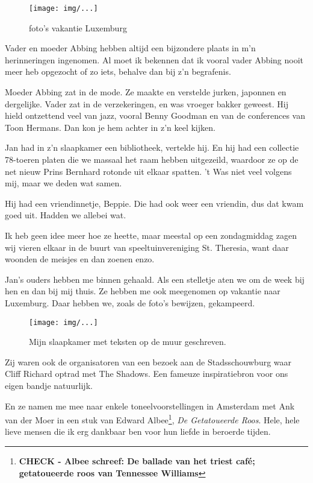 \documentclass[10pt,twoside,openright]{memoir}
\begin{document}
\begin{figure}[t]
\texttt{[image: img/...]}
\caption{foto’s vakantie Luxemburg}
\end{figure}

Vader en moeder Abbing hebben altijd een bijzondere plaats in m’n herinneringen ingenomen. Al moet ik bekennen dat ik vooral vader Abbing nooit meer heb opgezocht of zo iets, behalve dan bij z’n begrafenis. 

Moeder Abbing zat in de mode. Ze maakte en verstelde jurken, japonnen en dergelijke. Vader zat in de verzekeringen, en was vroeger bakker geweest. Hij hield ontzettend veel van jazz, vooral Benny Goodman en van de conferences van Toon Hermans. Dan kon je hem achter in z’n keel kijken. 

Jan had in z’n slaapkamer een bibliotheek, vertelde hij. En hij had een collectie 78-toeren platen die we massaal het raam hebben uitgezeild, waardoor ze op de net nieuw Prins Bernhard rotonde uit elkaar spatten. ’t Was niet veel volgens mij, maar we deden wat samen. 

Hij had een vriendinnetje, Beppie. Die had ook weer een vriendin, dus dat kwam goed uit. Hadden we allebei wat. 

Ik heb geen idee meer hoe ze heette, maar meestal op een zondagmiddag zagen wij vieren elkaar in de buurt van speeltuinvereniging St. Theresia, want daar woonden de meisjes en dan zoenen enzo.

Jan’s ouders hebben me binnen gehaald. Als een stelletje aten we om de week bij hen en dan bij mij thuis. Ze hebben me ook meegenomen op vakantie naar Luxemburg. Daar hebben we, zoals de foto’s bewijzen, gekampeerd. 

\begin{figure}[t]
\texttt{[image: img/...]}
\caption{Mijn slaapkamer met teksten op de muur geschreven.}
\end{figure}

Zij waren ook de organisatoren van een bezoek aan de Stadsschouwburg waar Cliff Richard optrad met The Shadows. Een fameuze inspiratiebron voor ons eigen bandje natuurlijk. 

En ze namen me mee naar enkele toneelvoorstellingen in Amsterdam met Ank van der Moer in een stuk van Edward Albee\footnote{\bf{CHECK} - Albee schreef: De ballade van het triest café; getatoueerde roos van Tennessee Williams}, \emph{De Getatoueerde Roos}. Hele, hele lieve mensen die ik erg dankbaar ben voor hun liefde in beroerde tijden. 
\end{document}
